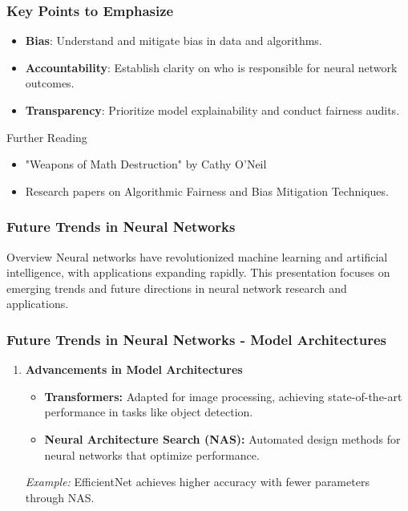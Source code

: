 \documentclass[aspectratio=169]{beamer}
\begin{document}
\begin{frame}[fragile]
  \frametitle{Key Points to Emphasize}
  \begin{itemize}
    \item \textbf{Bias}: Understand and mitigate bias in data and algorithms.
    \item \textbf{Accountability}: Establish clarity on who is responsible for neural network outcomes.
    \item \textbf{Transparency}: Prioritize model explainability and conduct fairness audits.
  \end{itemize}
  
  \begin{block}{Further Reading}
    \begin{itemize}
      \item "Weapons of Math Destruction" by Cathy O'Neil
      \item Research papers on Algorithmic Fairness and Bias Mitigation Techniques.
    \end{itemize}
  \end{block}
\end{frame}

\begin{frame}[fragile]
  \frametitle{Future Trends in Neural Networks}
  \begin{block}{Overview}
    Neural networks have revolutionized machine learning and artificial intelligence, with applications expanding rapidly. This presentation focuses on emerging trends and future directions in neural network research and applications.
  \end{block}
\end{frame}

\begin{frame}[fragile]
  \frametitle{Future Trends in Neural Networks - Model Architectures}
  \begin{enumerate}
    \item \textbf{Advancements in Model Architectures}
      \begin{itemize}
        \item \textbf{Transformers:} Adapted for image processing, achieving state-of-the-art performance in tasks like object detection.
        \item \textbf{Neural Architecture Search (NAS):} Automated design methods for neural networks that optimize performance.
      \end{itemize}
      \textit{Example:} EfficientNet achieves higher accuracy with fewer parameters through NAS.
  \end{enumerate}
\end{frame}
\end{document}
